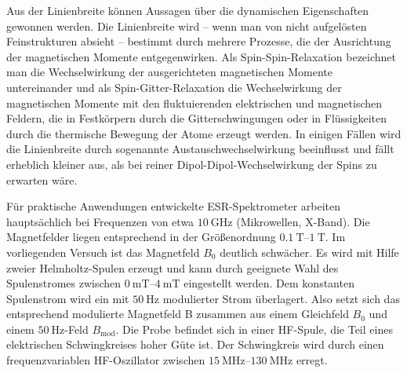 \documentclass[ngerman]{scrartcl}
\begin{document}
Aus der Linienbreite können Aussagen über die dynamischen Eigenschaften gewonnen werden. Die Linienbreite wird -- wenn man von nicht aufgelösten Feinstrukturen absieht -- bestimmt durch mehrere Prozesse, die der Ausrichtung der magnetischen Momente entgegenwirken. Als Spin-Spin-Relaxation bezeichnet man die Wechselwirkung der ausgerichteten magnetischen Momente untereinander und als Spin-Gitter-Relaxation die Wechselwirkung der magnetischen Momente mit den fluktuierenden elektrischen und magnetischen Feldern, die in Festkörpern durch die Gitterschwingungen oder in Flüssigkeiten durch die thermische Bewegung der Atome erzeugt werden. In einigen Fällen wird die Linienbreite durch sogenannte Austauschwechselwirkung beeinflusst und fällt erheblich kleiner aus, als bei reiner Dipol-Dipol-Wechselwirkung der Spins zu erwarten wäre.

Für praktische Anwendungen entwickelte ESR-Spektrometer arbeiten hauptsächlich bei Frequenzen von etwa $\SI{10}{\giga\hertz}$ (Mikrowellen, X-Band). Die Magnetfelder liegen entsprechend in der Größenordnung $\SIrange{0.1}{1}{\tesla}$. Im vorliegenden Versuch ist das Magnetfeld $B_0$ deutlich schwächer. Es wird mit Hilfe zweier Helmholtz-Spulen erzeugt und kann durch geeignete Wahl des Spulenstromes zwischen $\SIrange{0}{4}{\milli\tesla}$ eingestellt werden. Dem konstanten Spulenstrom wird ein mit $\SI{50}{\hertz}$ modulierter Strom überlagert. Also setzt sich das entsprechend modulierte Magnetfeld B zusammen aus einem Gleichfeld $B_0$ und einem $\SI{50}{\hertz}$-Feld $B_{\text{mod}}$. Die Probe befindet sich in einer HF-Spule, die Teil eines elektrischen Schwingkreises hoher Güte ist. Der Schwingkreis wird durch einen frequenzvariablen HF-Oszillator zwischen $\SIrange{15}{130}{\mega\hertz}$ erregt.
\end{document}
